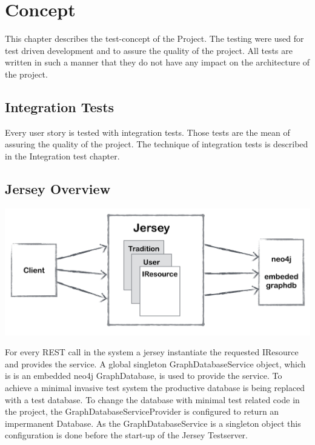 \documentclass[11pt,fleqn,openany]{book} %
\begin{document}

\chapter{Concept}
This chapter describes the test-concept of the Project. The testing were used for test driven development and to assure the quality of the project. All tests are written in such a manner that they do not have any impact on the architecture of the project. 

\section*{Integration Tests}
Every user story is tested with integration tests. Those tests are the mean of assuring the quality of the project. The technique of integration tests is described in the Integration test chapter. 

\newpage

\section*{Jersey Overview} 

\begin{center}
\includegraphics[scale=.40]{Pictures/jerseyoverview.png} 
\end{center}

For every REST call in the system a jersey instantiate the requested IResource and provides the service. A global singleton GraphDatabaseService object, which is is an embedded neo4j GraphDatabase, is used to provide the service. To achieve a minimal invasive test system the productive database is being replaced with a test database. To change the database with minimal test related code in the project, the GraphDatabaseServiceProvider is configured to return an impermanent Database. As the GraphDatabaseService is a singleton object this configuration is done before the start-up of the Jersey Testserver.
\end{document}
